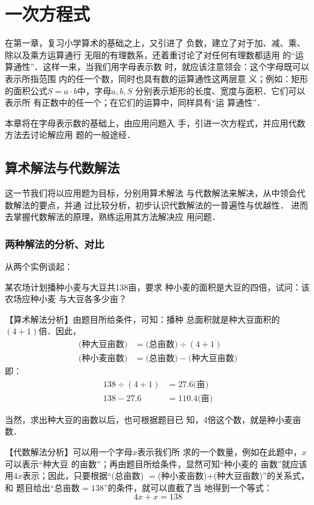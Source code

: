 \chapter{一次方程式}


    在第一章，复习小学算术的基础之上，又引进了
负数，建立了对于加、减、乘、除以及乘方运算通行
无阻的有理数系，还着重讨论了对任何有理数都适用
的“运算通性”．这样一来，当我们用字母表示数
时，就应该注意领会：这个字母既可以表示所指范围
内的任一个数，同时也具有数的运算通性这两层意
义；例如：矩形的面积公式$S=a\cdot b$中，字母$a,  b,  S$
分别表示矩形的长度、宽度与面积．它们可以表示所
有正数中的任一个；在它们的运算中，同样具有“运
算通性”．

    本章将在字母表示数的基础上，由应用问题入
手，引进一次方程式，并应用代数方法去讨论解应用
题的一般途经．

\section{算术解法与代数解法}
    这一节我们将以应用题为目标，分别用算术解法
与代数解法来解决，从中领会代数解法的要点，并通
过比较分析，初步认识代数解法的一普遍性与优越性．
进而去掌握代数解法的原理，熟练运用其方法解决应
用问题．

\subsection{两种解法的分析、对比}
从两个实例谈起：

\begin{example}
    某农场计划播种小麦与大豆共138亩，要求
种小麦的面积是大豆的四倍，试问：该农场应种小麦
与大豆各多少亩？
\end{example}

【算术解法分析】由题目所给条件，可知：播种
总面积就是种大豆面积的$(4 + 1)$倍．因此，
\[\begin{split}
    \text{(种大豆亩数)}&=\text{(总亩数)}\div (4 + 1)\\
    \text{(种小麦亩数)}&=\text{(总亩数)}-\text{(种大豆亩数)}
\end{split}\]
即：
\begin{align*}
    138\div(4 + 1)&=27.6\text{(亩)}\tag{大豆亩数}\\
    138-27. 6 &= 110.4\text{(亩)}\tag{小麦亩数}
\end{align*}

当然，求出种大豆的亩数以后，也可根据题目已
知，4倍这个数，就是种小麦亩数．

【代数解法分析】可以用一个字母$x$表示我们所
求的一个数量，例如在此题中，$x$可以表示“种大豆
的亩数”；再由题目所给条件，显然可知“种小麦的
亩数”就应该用$4x$表示；因此，只要根据“(总亩数)
$=$(种小麦亩数)$+$(种大豆亩数)”的关系式，和
题目给出“总亩数$=138$”的条件，就可以直截了当
地得到一个等式：
\[4x+x=138\]    

